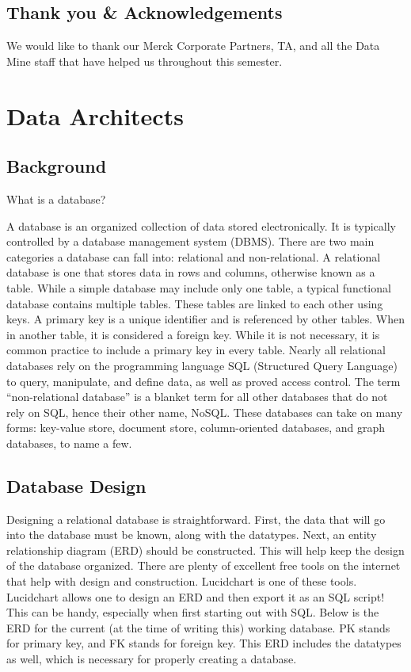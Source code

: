 \documentclass[]{book}
\begin{document}
\section{Thank you \&
Acknowledgements}\label{thank-you-acknowledgements}

We would like to thank our Merck Corporate Partners, TA, and all the
Data Mine staff that have helped us throughout this semester.

\chapter{Data Architects}\label{data-architects}

\section{Background}\label{background}

What is a database?

A database is an organized collection of data stored electronically. It
is typically controlled by a database management system (DBMS). There
are two main categories a database can fall into: relational and
non-relational. A relational database is one that stores data in rows
and columns, otherwise known as a table. While a simple database may
include only one table, a typical functional database contains multiple
tables. These tables are linked to each other using keys. A primary key
is a unique identifier and is referenced by other tables. When in
another table, it is considered a foreign key. While it is not
necessary, it is common practice to include a primary key in every
table. Nearly all relational databases rely on the programming language
SQL (Structured Query Language) to query, manipulate, and define data,
as well as proved access control. The term ``non-relational database''
is a blanket term for all other databases that do not rely on SQL, hence
their other name, NoSQL. These databases can take on many forms:
key-value store, document store, column-oriented databases, and graph
databases, to name a few.

\section{Database Design}\label{database-design}

Designing a relational database is straightforward. First, the data that
will go into the database must be known, along with the datatypes. Next,
an entity relationship diagram (ERD) should be constructed. This will
help keep the design of the database organized. There are plenty of
excellent free tools on the internet that help with design and
construction. Lucidchart is one of these tools. Lucidchart allows one to
design an ERD and then export it as an SQL script! This can be handy,
especially when first starting out with SQL. Below is the ERD for the
current (at the time of writing this) working database. PK stands for
primary key, and FK stands for foreign key. This ERD includes the
datatypes as well, which is necessary for properly creating a database.
\end{document}
